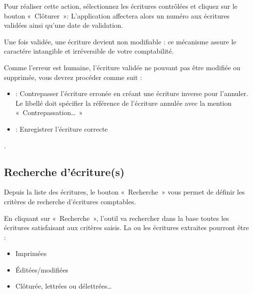 \documentclass[a4paper,10pt,oneside,french]{sphinxmanual}
\begin{document}
\sphinxAtStartPar
Pour réaliser cette action, sélectionnez les écritures contrôlées et cliquez sur le bouton « Clôturer »: L’application affectera alors un numéro aux écritures validées ainsi qu’une date de validation.

\sphinxAtStartPar
Une fois validée, une écriture devient non modifiable : ce mécanisme assure le caractére intangible et irréversible de votre comptabilité.

\sphinxAtStartPar
Comme l’erreur est humaine, l’écriture validée ne pouvant pas être modifiée ou supprimée, vous devrez procéder comme suit :
\begin{itemize}
\item {} 
 : Contrepasser l’écriture erronée en créant une écriture inverse pour l’annuler. Le libellé doit spécifier la référence de l’écriture annulée avec la mention « Contrepassation… »

\item {} 
 : Enregistrer l’écriture correcte

\end{itemize}

\sphinxAtStartPar
{}.


\subsection{Recherche d’écriture(s)}
\label{\detokenize{accounting/entity:recherche-d-ecriture-s}}
\sphinxAtStartPar
Depuis la liste des écritures, le bouton « Recherche » vous permet de définir les critères de recherche d’écritures comptables.
\begin{quote}

\noindent{}
\end{quote}

\sphinxAtStartPar
En cliquant sur « Recherche », l’outil va rechercher dans la base toutes les écritures satisfaisant aux critères saisis.
La ou les écritures extraites pourront être :
\begin{itemize}
\item {} 
\sphinxAtStartPar
Imprimées

\item {} 
\sphinxAtStartPar
Éditées/modifiées

\item {} 
\sphinxAtStartPar
Clôturée, lettrées ou délettrées…

\end{itemize}
\end{document}
